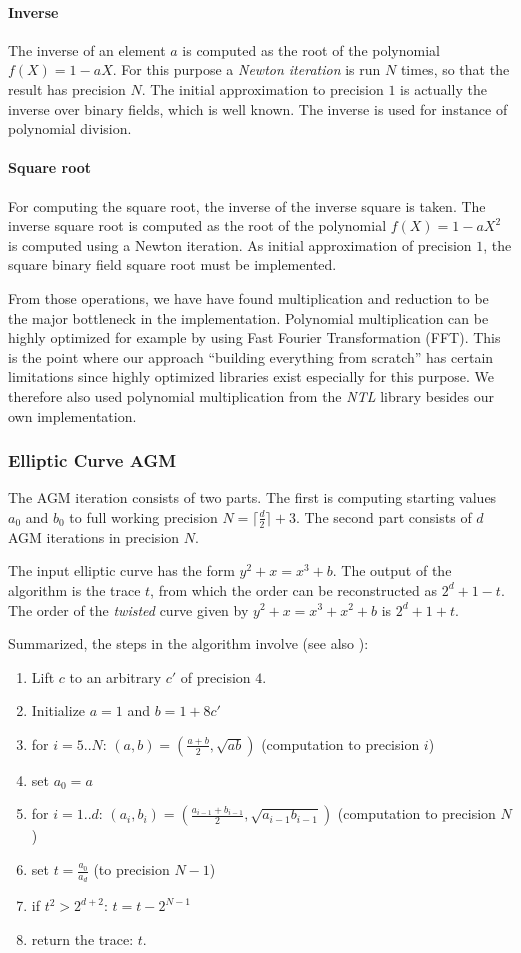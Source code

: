 \documentclass[11pt,english]{article}
\begin{document}
\paragraph{Inverse}
The inverse of an element $a$ is computed as the root of the polynomial $f(X)=1-aX$. For this purpose a \emph{Newton iteration} is run $N$ times, so that the result has precision $N$. The initial approximation to precision $1$ is actually the inverse over binary fields, which is well known. The inverse is used for instance of polynomial division.
\paragraph{Square root}
For computing the square root, the inverse of the inverse square is taken. The inverse square root is computed as the root of the polynomial $f(X)=1-aX^2$ is computed using a Newton iteration. As initial approximation of precision $1$, the square binary field square root must be implemented.

From those operations, we have have found multiplication and reduction to be the major bottleneck in the implementation. Polynomial multiplication can be highly optimized for example by using Fast Fourier Transformation (FFT). This is the point where our approach ``building everything from scratch'' has certain limitations since highly optimized libraries exist especially for this purpose. We therefore also used polynomial multiplication from the \emph{NTL} library besides our own implementation.

\subsubsection{Elliptic Curve AGM}
The AGM iteration consists of two parts. The first is computing starting values $a_0$ and $b_0$ to full working precision $N=\lceil\frac{d}{2}\rceil+3$. The second part consists of $d$ AGM iterations in precision $N$.

The input elliptic curve has the form $y^2+x=x^3+b$. The output of the algorithm is the trace $t$, from which the order can be reconstructed as $2^d+1-t$. The order of the \emph{twisted} curve given by $y^2+x=x^3+x^2+b$ is $2^d+1+t$.

Summarized, the steps in the algorithm involve (see also \cite{handbook}):
\begin{enumerate}
 \item Lift $c$ to an arbitrary $c'$ of precision $4$.
 \item Initialize $a=1$ and $b=1+8c'$
 \item for $i=5..N$: $(a,b)=(\frac{a+b}{2},\sqrt{ab})$ (computation to precision $i$)
 \item set $a_0=a$
 \item for $i=1..d$: $(a_i,b_i)=(\frac{a_{i-1}+b_{i-1}}{2},\sqrt{a_{i-1}b_{i-1}})$ (computation to precision $N$)
 \item set $t=\frac{a_0}{a_d}$ (to precision $N-1$)
 \item if $t^2>2^{d+2}$: $t=t-2^{N-1}$
 \item return the trace: $t$.
\end{enumerate}
\end{document}
